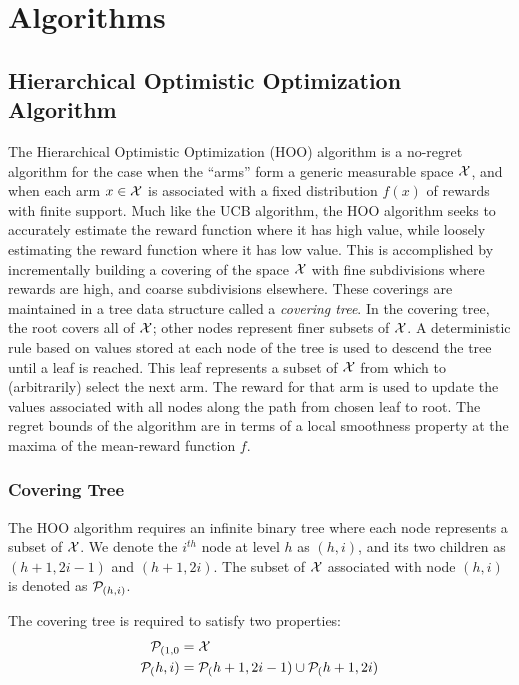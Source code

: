 \section{Algorithms}

\subsection{Hierarchical Optimistic Optimization Algorithm}

The Hierarchical Optimistic Optimization (HOO) algorithm is a
no-regret algorithm for the case when the ``arms'' form a generic
measurable space ${\mathcal{X}}$, and when each arm $x \in {\mathcal{X}}$ is associated
with a fixed distribution $f(x)$ of rewards with finite support. Much
like the UCB algorithm, the HOO algorithm seeks to accurately estimate
the reward function where it has high value, while loosely estimating
the reward function where it has low value. This is accomplished by
incrementally building a covering of the space ${\mathcal{X}}$ with fine
subdivisions where rewards are high, and coarse subdivisions
elsewhere. These coverings are maintained in a tree data structure
called a \emph{covering tree}. In the covering tree, the root covers
all of ${\mathcal{X}}$; other nodes represent finer subsets of ${\mathcal{X}}$. A
deterministic rule based on values stored at each node of the tree is
used to descend the tree until a leaf is reached. This leaf represents
a subset of ${\mathcal{X}}$ from which to (arbitrarily) select the next arm. The
reward for that arm is used to update the values associated with all
nodes along the path from chosen leaf to root. The regret bounds of
the algorithm are in terms of a local smoothness property at the
maxima of the mean-reward function $f$.

\subsubsection{Covering Tree}\label{sss:coverTree}
The HOO algorithm requires an infinite binary tree where each node
represents a subset of ${\mathcal{X}}$. We denote the $i^{th}$ node at level
$h$ as $(h,i)$, and its two children as $(h+1, 2i-1)$ and $(h+1,
2i)$. The subset of ${\mathcal{X}}$ associated with node $(h,i)$ is denoted
as ${\mathcal{P}}_{(h,i)}$.

The covering tree is required to satisfy two properties:
\begin{align*}
  {\mathcal{P}}_{(1,0} &= {\mathcal{X}}\\
  {\mathcal{P}}_({h,i}) &= {\mathcal{P}}_({h+1,2i-1}) \cup {\mathcal{P}}_({h+1,2i})
\end{align*}

